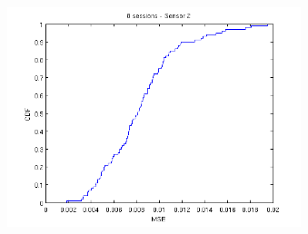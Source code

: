 \documentclass[9pt,handout,serif]{beamer}
\begin{document}
\begin{frame}[c]
\begin{columns}
\begin{figure}
		\end{figure}
		\begin{figure}
			\centering
			\includegraphics[width=1\textwidth]{../images/results/autocorrelation/localview/mse/8sessions_mse_sensor2}
		\end{figure}
	\end{columns}
\end{frame}
\end{document}
